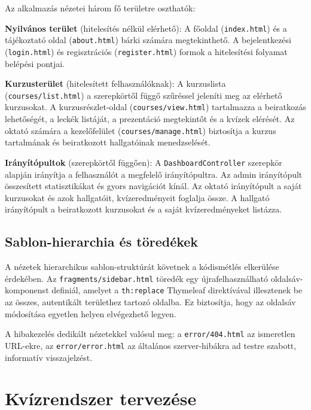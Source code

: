 Az alkalmazás nézetei három fő területre oszthatók:

\textbf{Nyilvános terület} (hitelesítés nélkül elérhető): A főoldal (\texttt{index.html}) és a tájékoztató oldal (\texttt{about.html}) bárki számára megtekinthető. A bejelentkezési (\texttt{login.html}) és regisztrációs (\texttt{register.html}) formok a hitelesítési folyamat belépési pontjai.

\textbf{Kurzusterület} (hitelesített felhasználóknak): A kurzuslista (\texttt{courses/list.html}) a szerepkörtől függő szűréssel jeleníti meg az elérhető kurzusokat. A kurzusrészlet-oldal (\texttt{courses/view.html}) tartalmazza a beiratkozás lehetőségét, a leckék listáját, a prezentáció megtekintőt és a kvízek elérését. Az oktató számára a kezelőfelület (\texttt{courses/manage.html}) biztosítja a kurzus tartalmának és beiratkozott hallgatóinak menedzselését.

\textbf{Irányítópultok} (szerepkörtől függően): A \texttt{DashboardController} szerepkör alapján irányítja a felhasználót a megfelelő irányítópultra. Az admin irányítópult összesített statisztikákat és gyors navigációt kínál. Az oktató irányítópult a saját kurzusokat és azok hallgatóit, kvízeredményeit foglalja össze. A hallgató irányítópult a beiratkozott kurzusokat és a saját kvízeredményeket listázza.

\subsection{Sablon-hierarchia és töredékek}

A nézetek hierarchikus sablon-struktúrát követnek a kódismétlés elkerülése érdekében. Az \texttt{fragments/sidebar.html} töredék egy újrafelhasználható oldalsáv-komponenst definiál, amelyet a \texttt{th:replace} Thymeleaf direktívával illesztenek be az összes, autentikált területhez tartozó oldalba. Ez biztosítja, hogy az oldalsáv módosítása egyetlen helyen elvégezhető legyen.

A hibakezelés dedikált nézetekkel valósul meg: a \texttt{error/404.html} az ismeretlen URL-ekre, az \texttt{error/error.html} az általános szerver-hibákra ad testre szabott, informatív visszajelzést.

\section{Kvízrendszer tervezése}


